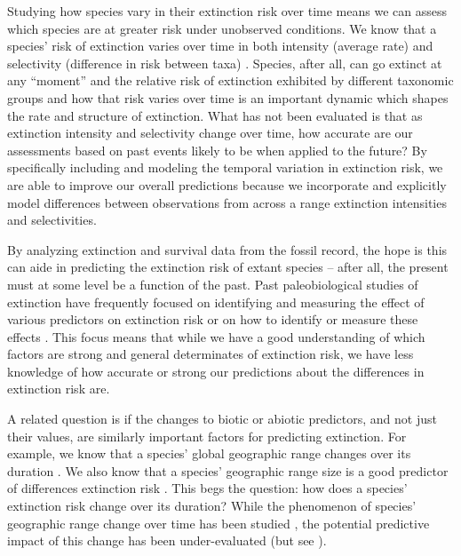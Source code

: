 \documentclass[12pt,letterpaper]{article}
\begin{document}
\begin{refsection}
Studying how species vary in their extinction risk over time means we can assess which species are at greater risk under unobserved conditions. We know that a species' risk of extinction varies over time in both intensity (average rate) and selectivity (difference in risk between taxa) \citep{Payne2007,Payne2016,Ezard2011}. Species, after all, can go extinct at any ``moment'' and the relative risk of extinction exhibited by different taxonomic groups and how that risk varies over time is an important dynamic which shapes the rate and structure of extinction. What has not been evaluated is that as extinction intensity and selectivity change over time, how accurate are our assessments based on past events likely to be when applied to the future? By specifically including and modeling the temporal variation in extinction risk, we are able to improve our overall predictions because we incorporate and explicitly model differences between observations from across a range extinction intensities and selectivities.

By analyzing extinction and survival data from the fossil record, the hope is this can aide in predicting the extinction risk of extant species -- after all, the present must at some level be a function of the past. Past paleobiological studies of extinction have frequently focused on identifying and measuring the effect of various predictors on extinction risk \citep{Harnik2011,Smits2015,Peters2008,Payne2007,Harnik2012,Ezard2011,Foote2006} or on how to identify or measure these effects \citep{Alroy2010a,Alroy2014,Alroy2001,Alroy2000,Alroy2000b,Foote2001}. This focus means that while we have a good understanding of which factors are strong and general determinates of extinction risk, we have less knowledge of how accurate or strong our predictions about the differences in extinction risk are. 


A related question is if the changes to biotic or abiotic predictors, and not just their values, are similarly important factors for predicting extinction. For example, we know that a species' global geographic range changes over its duration \citep{Foote2007,Liow2010,Liow2007,Kiessling2013}. We also know that a species' geographic range size is a good predictor of differences extinction risk \citep{Payne2007,Jablonski2003,Jablonski2008,Jablonski2006}. This begs the question: how does a species' extinction risk change over its duration? While the phenomenon of species' geographic range change over time has been studied \citep{Foote2007,Liow2010,Liow2007,Kiessling2013}, the potential predictive impact of this change has been under-evaluated (but see \citet{Kiessling2013}). 


\end{refsection}
\end{document}
